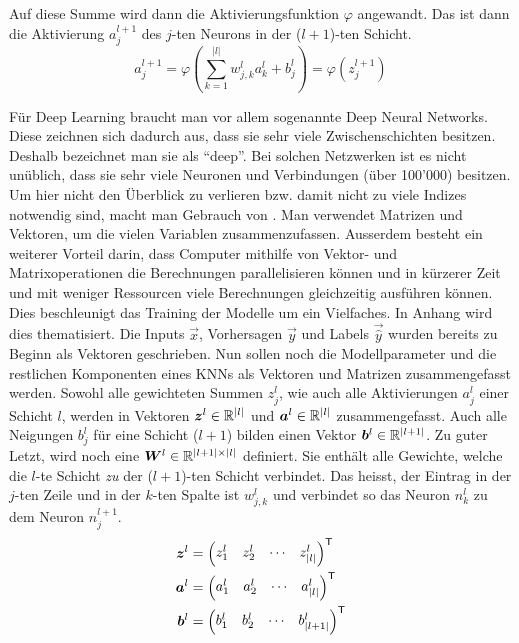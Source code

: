 Auf diese Summe wird dann die Aktivierungsfunktion $\varphi$ angewandt.
Das ist dann die Aktivierung $a_j^{l+1}$ des $j$-ten Neurons in der ($l+1$)-ten Schicht.
\\
\begin{equation}\tag{FP2}\label{eq:aktivierung_normal}
  a_j^{l+1} = \varphi\left(\sum_{k=1}^{|l|} w_{j,k}^l a_k^{l} + b_j^l \right) = \varphi \left( z_j^{l+1} \right)
\end{equation}
\par\bigskip
Für Deep Learning braucht man vor allem sogenannte Deep Neural Networks. Diese
zeichnen sich dadurch aus, dass sie sehr viele Zwischenschichten besitzen.
Deshalb bezeichnet man sie als ``deep''.
Bei solchen Netzwerken ist es nicht unüblich,
dass sie sehr viele Neuronen und Verbindungen (über 100'000) besitzen.
Um hier nicht den Überblick zu verlieren bzw. damit nicht zu viele Indizes notwendig
sind, macht man Gebrauch von . Man verwendet
Matrizen und Vektoren, um die vielen Variablen zusammenzufassen.
Ausserdem besteht ein weiterer Vorteil darin, dass Computer mithilfe von Vektor-
und Matrixoperationen die Berechnungen parallelisieren können und in kürzerer
Zeit und mit weniger Ressourcen viele Berechnungen gleichzeitig ausführen können.
Dies beschleunigt das Training der Modelle um
ein Vielfaches. In Anhang  wird dies thematisiert.
\para{}
Die Inputs $\vec{x}$, Vorhersagen $\vec{y}$ und Labels $\vec{\hat{y}}$ wurden
bereits zu Beginn als Vektoren geschrieben.
Nun sollen noch die Modellparameter und die restlichen Komponenten eines KNNs als Vektoren und Matrizen zusammengefasst werden.
Sowohl alle gewichteten Summen $z_j^l$, wie auch alle Aktivierungen $a_j^l$
einer Schicht $l$, werden in Vektoren $\bm{z}^l \in \mathbb{R}^{|l|}$ und
$\bm{a}^l \in \mathbb{R}^{|l|}$ zusammengefasst.
Auch alle Neigungen $b_j^l$ für eine Schicht ($l+1$) bilden einen Vektor
$\bm{b}^l \in \mathbb{R}^{|l+1|}$.
\para{}
Zu guter Letzt, wird noch eine  $\bm{W}^l \in
\mathbb{R}^{|l+1| \times |l|}$
definiert. Sie enthält alle Gewichte, welche die $l$-te
Schicht \textit{zu} der ($l+1$)-ten Schicht verbindet.
Das heisst, der Eintrag in der $j$-ten Zeile und in
der $k$-ten Spalte ist $w_{j,k}^l$ und verbindet so das Neuron $n_k^{l}$ zu
dem Neuron $n_j^{l+1}$.
\\
\begin{align*}
  \bm{z}^l &=  \begin{pmatrix} z_1^l & z_2^l & \cdots & z_{|l|}^l \end{pmatrix}^{\mathsf{T}} \\
  \bm{a}^l &=  \begin{pmatrix} a_1^l & a_2^l & \cdots & a_{|l|}^l \end{pmatrix}^{\mathsf{T}} \\
  \bm{b}^l &=  \begin{pmatrix} b_1^l & b_2^l & \cdots & b_{|l+1|}^l \end{pmatrix}^{\mathsf{T}} \\
\end{align*}
